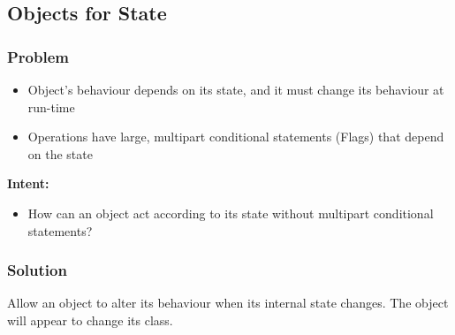 \subsection{Objects for State}
\subsubsection{Problem}
\begin{itemize}
    \item Object's behaviour depends on its state, and it must change its behaviour at run-time
    \item Operations have large, multipart conditional statements (Flags) that depend on the state
\end{itemize}
\textbf{Intent:}
\begin{itemize}
    \item How can an object act according to its state without multipart conditional statements?
\end{itemize}
\subsubsection{Solution}
Allow an object to alter its behaviour when its internal state changes. The object will appear to change its class.